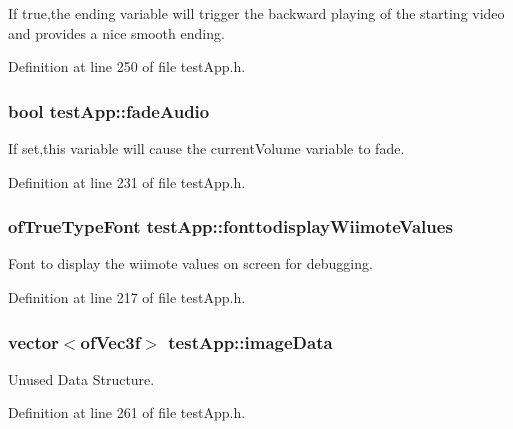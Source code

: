 If true,the ending variable will trigger the backward playing of the starting video and provides a nice smooth ending. 



Definition at line 250 of file test\-App.\-h.

\hypertarget{classtest_app_a918c09b5a4389a8402cfacb25d390226}{
\subsubsection[{fade\-Audio}]{\setlength{\rightskip}{0pt plus 5cm}bool test\-App\-::fade\-Audio}}\label{classtest_app_a918c09b5a4389a8402cfacb25d390226}


If set,this variable will cause the current\-Volume variable to fade. 



Definition at line 231 of file test\-App.\-h.

\hypertarget{classtest_app_ab336e228840f001d15f9b1eb3a30972f}{
\subsubsection[{fonttodisplay\-Wiimote\-Values}]{\setlength{\rightskip}{0pt plus 5cm}of\-True\-Type\-Font test\-App\-::fonttodisplay\-Wiimote\-Values}}\label{classtest_app_ab336e228840f001d15f9b1eb3a30972f}


Font to display the wiimote values on screen for debugging. 



Definition at line 217 of file test\-App.\-h.

\hypertarget{classtest_app_a500cd1228b3364bf30c8fb185e375688}{
\subsubsection[{image\-Data}]{\setlength{\rightskip}{0pt plus 5cm}vector$<$of\-Vec3f$>$ test\-App\-::image\-Data}}\label{classtest_app_a500cd1228b3364bf30c8fb185e375688}


Unused Data Structure. 



Definition at line 261 of file test\-App.\-h.

